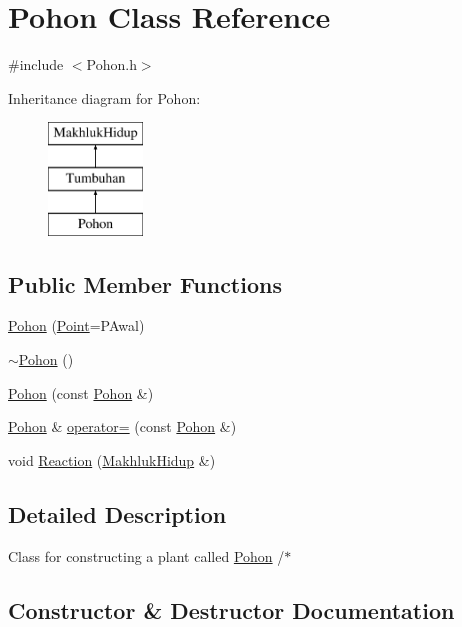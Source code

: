 \hypertarget{class_pohon}{}\section{Pohon Class Reference}
\label{class_pohon}


{\ttfamily \#include $<$Pohon.\+h$>$}

Inheritance diagram for Pohon\+:\begin{figure}[H]
\begin{center}
\leavevmode
\includegraphics[height=3.000000cm]{class_pohon}
\end{center}
\end{figure}
\subsection*{Public Member Functions}
\begin{DoxyCompactItemize}
\item 
\hyperlink{class_pohon_a0932970c0c4a4a4610ec5fe5724f1282}{Pohon} (\hyperlink{class_point}{Point}=P\+Awal)
\item 
\hyperlink{class_pohon_a4947ef4d078857340a2bdd384a17c4a7}{$\sim$\+Pohon} ()
\item 
\hyperlink{class_pohon_a7f0943d22d2b17a5545269c39dfa7a6a}{Pohon} (const \hyperlink{class_pohon}{Pohon} \&)
\item 
\hyperlink{class_pohon}{Pohon} \& \hyperlink{class_pohon_a31703236f73d7d043bdb78e060692ba2}{operator=} (const \hyperlink{class_pohon}{Pohon} \&)
\item 
void \hyperlink{class_pohon_a5c0b3b644fe9109e7ec219bbe04b24ff}{Reaction} (\hyperlink{class_makhluk_hidup}{Makhluk\+Hidup} \&)
\end{DoxyCompactItemize}


\subsection{Detailed Description}
Class for constructing a plant called \hyperlink{class_pohon}{Pohon} /$\ast$ 

\subsection{Constructor \& Destructor Documentation}
